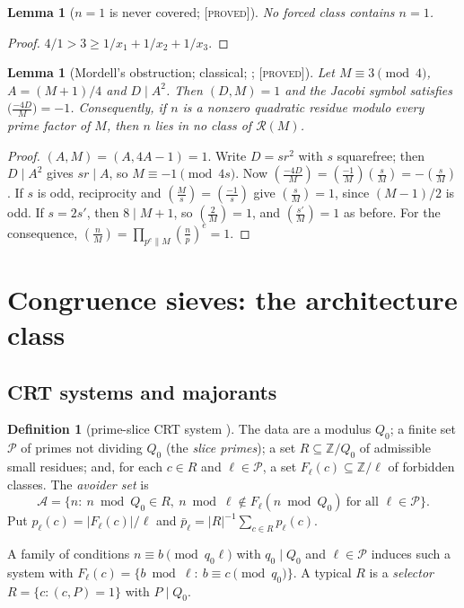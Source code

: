 \documentclass[10pt,reqno]{amsart}
\newtheorem{lemma}[theorem]{Lemma}
\theoremstyle{definition}
\newtheorem{definition}[theorem]{Definition}
\theoremstyle{remark}
\newcommand{\A}{\mathcal A}
\newcommand{\cP}{\mathcal P}
\newcommand{\cR}{\mathscr R}
\newcommand{\Z}{\mathbb Z}
\newcommand{\lab}[1]{\textup{[\textsc{#1}]}}
\begin{document}
\begin{lemma}[$n=1$ is never covered; \lab{proved}]\label{lem:one}
No forced class contains $n=1$.
\end{lemma}
\begin{proof}
$4/1>3\geq1/x_1+1/x_2+1/x_3$.
\end{proof}

\begin{lemma}[Mordell's obstruction; classical; {\cite[Lemma~1.1]{TW}}; \lab{proved}]\label{lem:mordell}
Let $M\equiv3\pmod4$, $A=(M+1)/4$ and $D\mid A^2$.  Then $(D,M)=1$ and
the Jacobi symbol satisfies $\bigl(\frac{-4D}{M}\bigr)=-1$.  Consequently,
if $n$ is a nonzero quadratic residue modulo every prime factor of $M$,
then $n$ lies in no class of $\cR(M)$.
\end{lemma}
\begin{proof}
$(A,M)=(A,4A-1)=1$.  Write $D=sr^2$ with $s$ squarefree; then $D\mid A^2$
gives $sr\mid A$, so $M\equiv-1\pmod{4s}$.  Now
$(\frac{-4D}M)=(\frac{-1}M)(\frac sM)=-(\frac sM)$.  If $s$ is odd,
reciprocity and $(\frac Ms)=(\frac{-1}s)$ give $(\frac sM)=1$, since
$(M-1)/2$ is odd.  If $s=2s'$, then $8\mid M+1$, so $(\frac2M)=1$, and
$(\frac{s'}M)=1$ as before.  For the consequence,
$(\frac nM)=\prod_{p^e\| M}(\frac np)^e=1$.
\end{proof}

\section{Congruence sieves: the architecture class}\label{sec:class}

\subsection{CRT systems and majorants}
\begin{definition}[prime-slice CRT system {\cite[\S1]{ET}}]\label{def:slice}
The data are a modulus $Q_0$; a finite set $\cP$ of primes not dividing
$Q_0$ (the \emph{slice primes}); a set $R\subseteq\Z/Q_0$ of admissible
small residues; and, for each $c\in R$ and $\ell\in\cP$, a set
$F_\ell(c)\subseteq\Z/\ell$ of forbidden classes.  The \emph{avoider set} is
\[
 \A=\{n:\ n\bmod Q_0\in R,\ n\bmod\ell\notin F_\ell(n\bmod Q_0)\
 \text{for all }\ell\in\cP\}.
\]
Put $p_\ell(c)=|F_\ell(c)|/\ell$ and $\bar p_\ell=|R|^{-1}\sum_{c\in R}p_\ell(c)$.
\end{definition}
A family of conditions $n\equiv b\pmod{q_0\ell}$ with $q_0\mid Q_0$ and
$\ell\in\cP$ induces such a system with
$F_\ell(c)=\{b\bmod\ell:\ b\equiv c\pmod{q_0}\}$.  A typical $R$ is a
\emph{selector} $R=\{c:(c,P)=1\}$ with $P\mid Q_0$.
\end{document}
